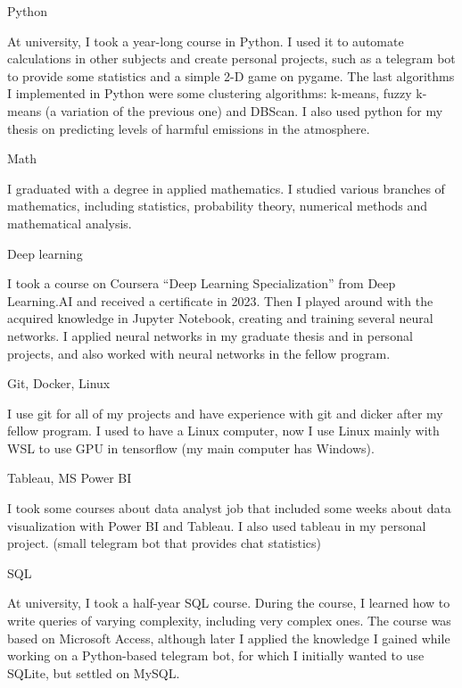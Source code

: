 \documentclass[10pt, letterpaper]{article}
\begin{document}
            
        \begin{onecolentry}
            \begin{highlightsforbulletentries}


            \item Python

            At university, I took a year-long course in Python. 
            I used it to automate calculations in other subjects and create personal projects, such as a telegram bot to provide some statistics and a simple 2-D game on pygame. 
            The last algorithms I implemented in Python were some clustering algorithms: k-means, fuzzy k-means (a variation of the previous one) and DBScan. 
            I also used python for my thesis on predicting levels of harmful emissions in the atmosphere.


            \item Math
            

            I graduated with a degree in applied mathematics. 
            I studied various branches of mathematics, including statistics, probability theory, numerical methods and mathematical analysis.


            \item Deep learning
            

            I took a course on Coursera “Deep Learning Specialization” from Deep Learning.AI and received a certificate in 2023.
            Then I played around with the acquired knowledge in Jupyter Notebook, creating and training several neural networks.
            I applied neural networks in my graduate thesis and in personal projects, and also worked with neural networks in the fellow program.

            \item Git, Docker, Linux
            

            I use git for all of my projects and have experience with git and dicker after my fellow program.
            I used to have a Linux computer, now I use Linux mainly with WSL to use GPU in tensorflow (my main computer has Windows).
            
            
            \item Tableau, MS Power BI
            

            I took some courses about data analyst job that included some weeks about data visualization with Power BI and Tableau. I also used tableau in my personal project. (small telegram bot that provides chat statistics)

            \item SQL
            

            At university, I took a half-year SQL course. 
            During the course, I learned how to write queries of varying complexity, including very complex ones. 
            The course was based on Microsoft Access, although later I applied the knowledge I gained while working on a Python-based telegram bot, for which I initially wanted to use SQLite, but settled on MySQL.
            

            \end{highlightsforbulletentries}
        \end{onecolentry}
\end{document}
